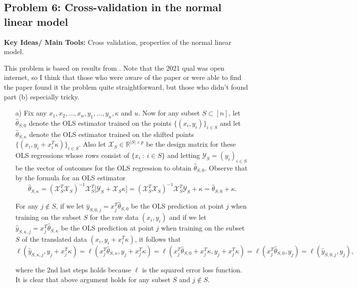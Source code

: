 \subsection*{Problem 6: Cross-validation in the normal linear model}

\textbf{Key Ideas/ Main Tools:} Cross validation, properties of the normal linear model.


This problem is based on results from \cite{Bates2022CrossVal}. Note that the 2021 qual was open internet, so I think that those who were aware of the paper or were able to find the paper found it the problem quite straightforward, but those who didn't found part (b) especially tricky.

\begin{enumerate}
\item[a)] Fix any $x_1,x_2, \dots,x_n, y_1,\dots,y_n, \kappa$ and $u$. Now for any subset $S \subset [n]$, let $\hat{\theta}_{S,0}$ denote the OLS estimator trained on the points $\{ (x_i,y_i) \}_{i \in S}$ and let $\hat{\theta}_{S,\kappa}$ denote the OLS estimator trained on the shifted points   $\{ (x_i,y_i +x_i^T \kappa) \}_{i \in S}$. Also let $\mathcal{X}_S \in \mathbb{R}^{\vert S \vert \times p}$ be the design matrix for these OLS regressions whose rows consist of $\{ x_i \ : \ i \in S \}$ and letting $\mathcal{Y}_S = (y_i )_{i \in S}$ be the vector of outcomes for the OLS regression to obtain $\hat{\theta}_{S,0}$. Observe that by the formula for an OLS estimator $$\hat{\theta}_{S,\kappa} = (\mathcal{X}_S^T \mathcal{X}_S)^{-1} \mathcal{X}_S^T \big[ \mathcal{Y}_S + \mathcal{X}_S \kappa \big] =  (\mathcal{X}_S^T \mathcal{X}_S)^{-1} \mathcal{X}_S^T \mathcal{Y}_S  + \kappa =\hat{\theta}_{S,0} +\kappa.$$

For any $j \notin S$, if we let $\hat{y}_{S,0,j} = x_j^T \hat{\theta}_{S,0}$ be the OLS prediction at point $j$ when training on the subset $S$ for the raw data $(x_i,y_i)$ and if we let $\hat{y}_{S,\kappa,j} = x_j^T \hat{\theta}_{S,\kappa}$ be the OLS prediction at point $j$ when training on the subset $S$ of the translated data $(x_i,y_i+x_i^T \kappa)$, it follows that $$\ell(\hat{y}_{S,\kappa,j} , y_j +x_j^T \kappa) =  \ell(x_j^T \hat{\theta}_{S,\kappa}, y_j +x_j^T \kappa)= \ell(x_j^T \hat{\theta}_{S,0} +x_j^T\kappa, y_j +x_j^T \kappa)  = \ell ( x_j^T \hat{\theta}_{S,0}, y_j)=\ell(\hat{y}_{S,0,j},y_j),$$

where the 2nd last steps holds because $\ell$ is the squared error loss function. It is clear that above argument holds for any subset $S$ and $j \notin S$. %


\end{enumerate}

